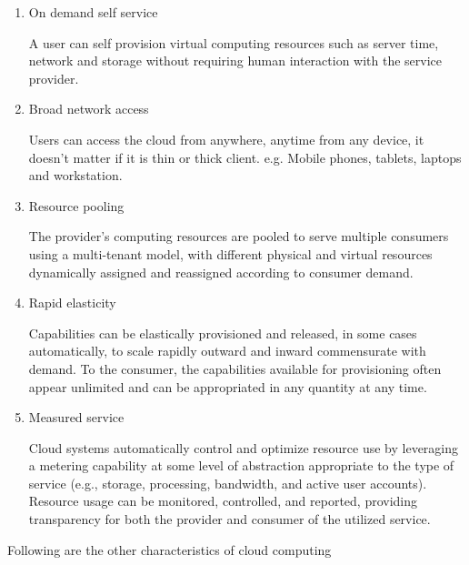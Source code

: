     \par
    \begin{enumerate}
    \item On demand self service
        \par A user can self provision virtual computing resources such as server time, network and storage without requiring human interaction with the service provider\cite{wiki}.
    \item Broad network access
        \par Users can access the cloud from anywhere, anytime from any device, it doesn't matter if it is thin or thick client. e.g. Mobile phones, tablets, laptops and workstation\cite{wiki}. 
    \item Resource pooling
        \par The provider's computing resources are pooled to serve multiple consumers using a multi-tenant model, with different physical and virtual resources dynamically assigned and reassigned according to consumer demand\cite{wiki}. 
    \item Rapid elasticity
        \par Capabilities can be elastically provisioned and released, in some cases automatically, to scale rapidly outward and inward commensurate with demand. To the consumer, the capabilities available for provisioning often appear unlimited and can be appropriated in any quantity at any time\cite{wiki}.
    \item Measured service
        \par Cloud systems automatically control and optimize resource use by leveraging a metering capability at some level of abstraction appropriate to the type of service (e.g., storage, processing, bandwidth, and active user accounts). Resource usage can be monitored, controlled, and reported, providing transparency for both the provider and consumer of the utilized service\cite{wiki}.
    \end{enumerate}
    
    \par Following are the other characteristics of cloud computing
    
